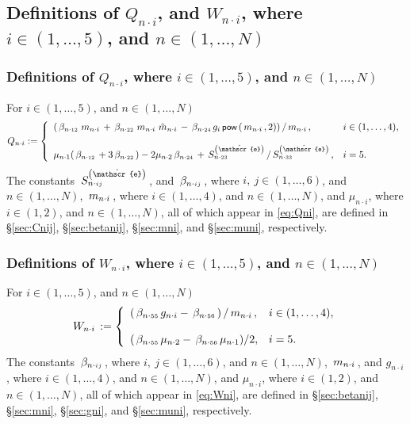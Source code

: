 \documentclass[preprint,12pt,times]{elsarticle}
\newcommand{\plus}[1]{\hat{#1}}
\numberwithin{equation}{section}
\newcommand{\physe}{\hat{\mathscr{e}}} %
\newcommand{\pr}[1]{\left( #1 \right)}
\newcommand{\p}{\,\textsf{\small pow}}
\newcommand{\msub}[2]{
\IfEqCase{#2}{
      {i}{\, m_{#1\cdot #2}\,}%
  }[\,m_{#1\cdot {\scriptscriptstyle #2}}\,]}
\newcommand{\gsub}[2]{g_{#1\cdot #2}}
\newcommand{\Qsub}[2]{Q_{#1\cdot #2}}
\newcommand{\Wsub}[2]{
\IfEqCase{#2}{
      {i}{\, W_{#1\cdot #2}\,}%
  }[\,W_{#1\cdot {\scriptscriptstyle #2}}\,]}
\newcommand{\musub}[2]{\mu_{#1\cdot #2}}
\newcommand{\betasub}[2]{
\IfEqCase{#2}{
       {xxxx}{\,\beta_{ {#1}\cdot { #2}}\,}%
   }[\,\beta_{ {#1}\cdot {\scriptscriptstyle #2}}\,]}
\newcommand{\Csub}[2]{
   \IfEqCase{#2}{
          {xxxx}{\,\beta_{ {#1}\cdot { #2}}\,}%
      }[\,S^{\pr{\physe}}_{ {#1}\cdot {\scriptscriptstyle #2}}\,]}
\newcommand{\intwo}{\in(1,2)}
\newcommand{\infour}{\in(1,\ldots,4)}
\newcommand{\infive}{\in(1,\ldots,5)}
\newcommand{\insix}{\in(1,\ldots,6)}
\newcommand{\inN}{\in(1,\ldots,N)}
\newcommand{\Subs}[3]{
\IfEqCase{#3}{
		{i}{\,#1_{ {#2}\cdot { \scriptstyle #3}}\,}%
	}[\,#1_{ {#2}\cdot {\scriptscriptstyle #3}}\,]}
\renewcommand{\>}{$\Rightarrow$}
\begin{document}
\subsection{Definitions of $\Qsub{n}{i}$, and $W_{n\cdot i}$, where $i\in (1,\ldots,5)$, and $n\in (1,\ldots,N)$} %
\label{sec:Qni}

\subsubsection{Definitions of $\Qsub{n}{i}$, where $i\in (1,\ldots,5)$, and $n\in (1,\ldots,N)$} %

For $i\infive$, and $n\in(1,\ldots,N)$
\begin{equation}
  \Qsub{n}{i} := 
 \left\{ 
	 \begin{array}{ll}
   \pr{\betasub{n}{12}\msub{n}{i} + \betasub{n}{22}\msub{n}{i}\Subs{\plus{m}}{n}{i} - \betasub{n}{24} g_i \p\pr{\msub{n}{i},2}}/\msub{n}{i}, & i\infour, \\ \\
\musub{n}{1}(\betasub{n}{12} + 3\betasub{n}{22})-2\musub{n}{2}\betasub{n}{24} + \Csub{n}{23}/\Csub{n}{33}, & i=5.
	 \end{array} 
\right.
\label{eq:Qni}
\end{equation}%
The constants $\Csub{n}{ij}$, and $\betasub{n}{ij}$, where $i,~j\insix$, and $n\inN$,  $\msub{n}{i}$, where $i\infour$, and $n\inN$, and $\musub{n}{i}$, where $i\intwo$, and $n\inN$, all of which appear in \eqref{eq:Qni}, are defined in \S\ref{sec:Cnij}, \S\ref{sec:betanij}, \S\ref{sec:mni}, and \S\ref{sec:muni}, respectively. %

\subsubsection{Definitions of $W_{n\cdot i}$, where $i\in (1,\ldots,5)$, and $n\in (1,\ldots,N)$} %
\label{sec:Wni}



For $i\infive$, and $n\in(1,\ldots,N)$
\begin{equation}
  \Wsub{n}{i} := 
 \left\{ 
	\begin{array}{ll}
		\pr{\betasub{n}{55} \gsub{n}{i} - \betasub{n}{56}}/\msub{n}{i}, & i\infour, \\ \\
		(\betasub{n}{55}\musub{n}{2} - \betasub{n}{56}\musub{n}{1})/2, & i=5.
	 \end{array} 
\right.
\label{eq:Wni}
\end{equation} %
The constants $\betasub{n}{ij}$, where $i,~j\insix$, and $n\inN$,  $\msub{n}{i}$, and $\gsub{n}{i}$, where $i\infour$, and $n\inN$, and $\musub{n}{i}$, where $i\intwo$, and $n\inN$, all of which appear in \eqref{eq:Wni}, are defined in \S\ref{sec:betanij}, \S\ref{sec:mni}, \S\ref{sec:gni}, and \S\ref{sec:muni}, respectively. %
\end{document}
